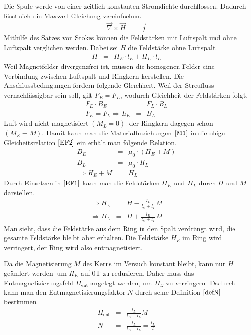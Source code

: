 \documentclass[12pt,a4paper]{scrartcl}
\numberwithin{equation}{section} %
\newcommand{\pu}[1]{\ensuremath{\mathrm{#1}}}
\renewcommand{\[}{} %
\renewcommand{\]}{\noindent} %
\begin{document}
Die Spule werde von einer zeitlich konstanten Stromdichte durchflossen. Dadurch lässt sich die Maxwell-Gleichung vereinfachen.
\begin{eqnarray}
    \vec \nabla \times \vec H &=& \vec j
\end{eqnarray}
Mithilfe des Satzes von Stokes können die Feldstärken mit Luftspalt und ohne Luftspalt verglichen werden. Dabei sei \(H\) die Feldstärke ohne Luftspalt. 
\begin{eqnarray}
    H &=& H_E\cdot l_E + H_L \cdot l_L \label{EF1}
\end{eqnarray}
Weil Magnetfelder divergenzfrei ist, müssen die homogenen Felder eine Verbindung zwischen Luftspalt und Ringkern herstellen. Die Anschlussbedingungen fordern folgende Gleichheit. Weil der Streufluss vernachlässigbar sein soll, gilt \(F_E = F_L\), wodurch Gleichheit der Feldstärken folgt.
\begin{eqnarray}
    F_E\cdot B_E &=& F_L\cdot B_L \nonumber \\
    F_E = F_L \Rightarrow B_E &=& B_L \label{EF2}
\end{eqnarray}
Luft wird nicht magnetisiert \((M_L=0)\), der Ringkern dagegen schon \((M_E=M)\). Damit kann man die Materialbeziehungen \(\eqref{M1}\) in die obige Gleicheitsrelation \(\eqref{EF2}\) ein erhält man folgende Relation.
\begin{eqnarray}
    B_E &=& \mu_0 \cdot \left(H_E + M\right) \nonumber \\
    B_L &=& \mu_0 \cdot H_L \nonumber \\
    \Rightarrow H_E + M &=& H_L \label{EF3}
\end{eqnarray}
Durch Einsetzen in \(\eqref{EF1}\) kann man die Feldstärken \(H_E\) und \(H_L\) durch \(H\) und \(M\) darstellen. 
\begin{eqnarray}
    \Rightarrow H_E &=& H - \frac{l_L}{l_E+l_L} M \\
    \Rightarrow H_L &=& H + \frac{l_E}{l_E+l_L} M
\end{eqnarray}
Man sieht, dass die Feldstärke aus dem Ring in den Spalt verdrängt wird, die gesamte Feldstärke bleibt aber erhalten. Die Feldstärke \(H_E\) im Ring wird verringert, der Ring wird also entmagnetisiert.

Da die Magnetisierung \(M\) des Kerns im Versuch konstant bleibt, kann nur \(H\) geändert werden, um \(H_E\) auf \(\pu{0T}\) zu reduzieren. Daher muss das Entmagnetisierungsfeld \(H_\mathrm{ent}\) angelegt 
werden, um \(H_E\) zu verringern. Dadurch kann man den Entmagnetisierungsfaktor \(N\) durch seine Definition \(\eqref{defN}\) bestimmen. 
\begin{eqnarray}
    H_\mathrm{ent} &=& \frac{l_L}{l_E+l_L} M \\
    N &=& \frac{l_L}{l_E+l_L} = \frac{l_L}{l}
\end{eqnarray}
\end{document}
